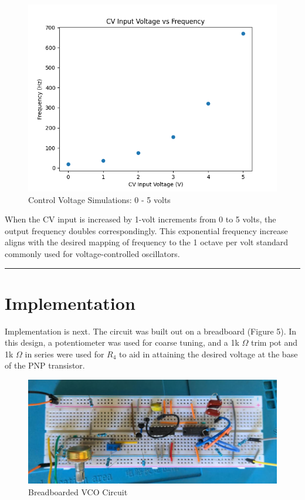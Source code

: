 \documentclass{article}
\begin{document}
\begin{figure}[H]
  \centering
  \includegraphics[width=.7\linewidth]{png/Figure_3.png}
  \caption{Control Voltage Simulations: 0 - 5 volts}
\end{figure}

When the CV input is increased by 1-volt increments from 0 to 5 volts, the output frequency doubles correspondingly. This exponential frequency increase aligns with the desired mapping of frequency to the 1 octave per volt standard commonly used for voltage-controlled oscillators.

\vspace{5mm}
\hrule
  
\section*{\textcolor{mycolor}{Implementation}}
Implementation is next. The circuit was built out on a breadboard (Figure 5). In this design, a potentiometer was used for coarse tuning, and a 1k $\Omega$ trim pot and 1k $\Omega$ in series were used for $R_4$ to aid in attaining the desired voltage at the base of the PNP transistor.

\begin{figure}[H]
  \centering
  \includegraphics[width=.89\linewidth]{png/vco_breadboard.png}
  \caption{Breadboarded VCO Circuit}
\end{figure}
\end{document}
